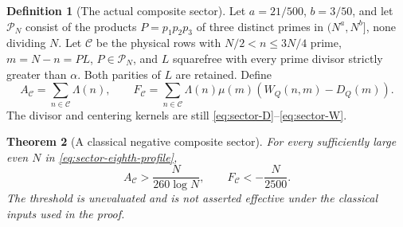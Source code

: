 \documentclass[11pt,a4paper]{article}
\newtheorem{theorem}{Theorem}[section]
\theoremstyle{definition}
\newtheorem{definition}[theorem]{Definition}
\theoremstyle{remark}
\begin{document}
\begin{definition}[The actual composite sector]
Let $a=21/500$, $b=3/50$, and let $\mathcal P_N$ consist of the
products $P=p_1p_2p_3$ of three distinct primes in
$(N^a,N^b]$, none dividing $N$.  Let $\mathcal C$ be the physical
rows with $N/2<n\leq3N/4$ prime, $m=N-n=PL$, $P\in\mathcal P_N$,
and $L$ squarefree with every prime divisor strictly greater than
$\alpha$.  Both parities of $L$ are retained.  Define
\[
 A_{\mathcal C}=\sum_{n\in\mathcal C}\Lambda(n),\qquad
 F_{\mathcal C}=\sum_{n\in\mathcal C}
              \Lambda(n)\mu(m)(W_Q(n,m)-D_Q(m)).
\]
The divisor and centering kernels are still
\eqref{eq:sector-D}--\eqref{eq:sector-W}.
\end{definition}

\begin{theorem}[A classical negative composite sector]
\label{thm:eighth-composite}
For every sufficiently large even $N$ in
\eqref{eq:sector-eighth-profile},
\begin{equation}
 A_{\mathcal C}>\frac{N}{260\log N},\qquad
                     F_{\mathcal C}<-\frac{N}{2500}.
 \label{eq:sector-eighth-composite-result}
\end{equation}
The threshold is unevaluated and is not asserted effective under
the classical inputs used in the proof.
\end{theorem}
\end{document}
